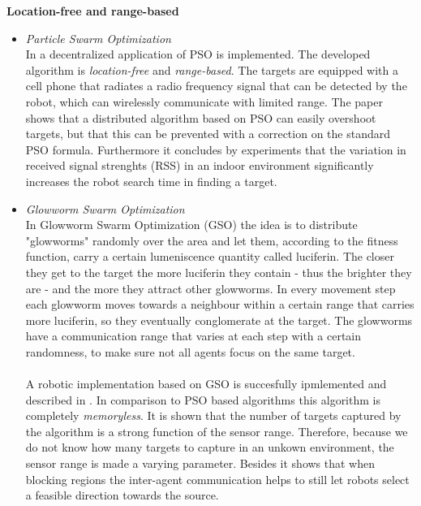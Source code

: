	\textbf{Location-free and range-based}
	\begin{itemize}
		\item
		\textit{Particle Swarm Optimization}\\
		In \cite{derr2009multi} a decentralized application of PSO is implemented.
		The developed algorithm is \emph{location-free} and \emph{range-based}.
		The targets are equipped with a cell phone that radiates a radio frequency signal that can be detected by the robot, which can wirelessly communicate with limited range.
		The paper shows that a distributed algorithm based on PSO can easily overshoot targets, but that this can be prevented with a correction on the standard PSO formula.
		Furthermore it concludes by experiments that the variation in received signal strenghts (RSS) in an indoor environment significantly increases the robot search time in finding a target.

		\item
		\textit{Glowworm Swarm Optimization}\\
		In Glowworm Swarm Optimization (GSO) the idea is to distribute "glowworms" randomly over the area and let them, according to the fitness function, carry a certain lumeniscence quantity called luciferin. 
		The closer they get to the target the more luciferin they contain - thus the brighter they are - and the more they attract other glowworms. 
		In every movement step each glowworm moves towards a neighbour within a certain range that carries more luciferin, so they eventually conglomerate at the target. 
		The glowworms have a communication range that varies at each step with a certain randomness, to make sure not all agents focus on the same target. \cite{krishnanand2006glowworm}\\
		\\
		A robotic implementation based on GSO is succesfully ipmlemented and described in \cite{krishnanand2005detection}.
		In comparison to PSO based algorithms this algorithm is completely \emph{memoryless}.
		It is shown that the number of targets captured by the algorithm is a strong function of the sensor range.
		Therefore, because we do not know how many targets to capture in an unkown environment, the sensor range is made a varying parameter.
		Besides it shows that when blocking regions the inter-agent communication helps to still let robots select a feasible direction towards the source.
	\end{itemize}

